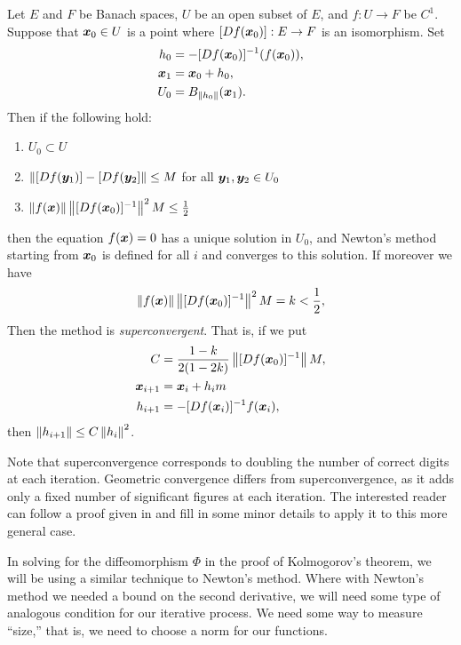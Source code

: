 \documentclass[twoside,letterpaper,11pt]{article}
\numberwithin{equation}{section}
\begin{document}
\begin{thm}[Kantorovitch]
  Let $E$ and $F$ be Banach spaces, $U$ be an open subset of $E$, and $f : U \to
  F$ be $C^1$.
  Suppose that $\bm{x}_0 \in U$ is a point where $[\mathop{}\!D f(\bm{x}_0)] : E \to F$
  is an isomorphism.
  Set
  \begin{align*}
    h_0 &= -[\Dif f(\bp{x}_0)]^{-1}(f(\bp{x}_0)),\\
    \bp{x}_1 &= \bp{x}_0 + h_0,\\
    U_0 &= B_{\norm{h_0}}(\bp{x}_1).
  \end{align*}
  Then if the following hold:
  \begin{enumerate}
  \item $U_0 \subset U$
  \item $\norm{[\Dif f(\bp{y}_1)] - [\Dif f(\bp{y}_2]} \leq M$ for all
    $\bm{y}_1, \bm{y}_2 \in U_0$
  \item $\norm{f(\bp{x})} \norm{[\Dif f(\bp{x}_0)]^{-1}}^2 M \leq \frac{1}{2}$
  \end{enumerate}
  then the equation $f(\bm{x}) = 0$ has a unique solution in $U_0$, and Newton's
  method starting from $\bm{x}_0$ is defined for all $i$ and converges to this
  solution.
  If moreover we have
  \begin{equation*}
    \norm{f(\bp{x})} \norm{[\Dif f(\bp{x}_0)]^{-1}}^2 M = k < \frac{1}{2},
  \end{equation*}
  Then the method is \emph{superconvergent}.
  That is, if we put
  \begin{align*}
    C &= \frac{1 - k}{2(1 - 2k)}\norm{[\Dif f(\bp{x}_0)]^{-1}} M,\\
    \bp{x}_{i+1} &= \bp{x}_i + h_im\\
    h_{i+1} &= -[\Dif f(\bp{x}_i)]^{-1} f(\bp{x}_i),
  \end{align*}
  then $\norm{h_{i+1}} \leq C \norm{h_i}^2$.
\end{thm}
Note that superconvergence corresponds to doubling the number of correct digits
at each iteration.
Geometric convergence differs from superconvergence, as it adds only a fixed
number of significant figures at each iteration.
The interested reader can follow a proof given in \cite{hh09} and fill in some
minor details to apply it to this more general case.

In solving for the diffeomorphism $\Phi$ in the proof of Kolmogorov's theorem,
we will be using a similar technique to Newton's method.
Where with Newton's method we needed a bound on the second derivative, we will
need some type of analogous condition for our iterative process.
We need some way to measure ``size,'' that is, we need to choose a norm for our
functions.
\end{document}
